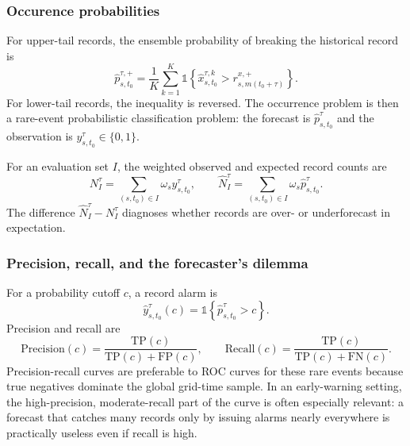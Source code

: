 \documentclass[11pt]{article}
\begin{document}
\subsubsection{Occurence probabilities}

For upper-tail records, the ensemble probability of breaking the historical record is
\begin{equation}
    \hat{p}^{\tau,+}_{s,t_0} = \frac{1}{K}\sum_{k=1}^{K}
    \mathbb{1}\left\{\hat{x}^{\tau,k}_{s,t_0} > r^{x,+}_{s,m(t_0+\tau)}\right\}.
    \label{eq:probupper}
\end{equation}
For lower-tail records, the inequality is reversed. The occurrence problem is then a rare-event probabilistic classification problem: the forecast is $\hat{p}^{\tau}_{s,t_0}$ and the observation is $y^{\tau}_{s,t_0}\in\{0,1\}$.

For an evaluation set $I$, the weighted observed and expected record counts are
\begin{equation}
    N^{\tau}_I = \sum_{(s,t_0)\in I}\omega_s y^{\tau}_{s,t_0}, \qquad
    \hat{N}^{\tau}_I = \sum_{(s,t_0)\in I}\omega_s \hat{p}^{\tau}_{s,t_0}.
    \label{eq:counts}
\end{equation}
The difference $\hat{N}^{\tau}_I - N^{\tau}_I$ diagnoses whether records are over- or underforecast in expectation. 

\subsubsection{Precision, recall, and the forecaster's dilemma}

For a probability cutoff $c$, a record alarm is
\begin{equation}
    \hat{y}^{\tau}_{s,t_0}(c) = \mathbb{1}\left\{\hat{p}^{\tau}_{s,t_0} > c\right\}.
    \label{eq:alarm}
\end{equation}
Precision and recall are
\begin{equation}
    \mathrm{Precision}(c)=\frac{\mathrm{TP}(c)}{\mathrm{TP}(c)+\mathrm{FP}(c)}, \qquad
    \mathrm{Recall}(c)=\frac{\mathrm{TP}(c)}{\mathrm{TP}(c)+\mathrm{FN}(c)}.
    \label{eq:pr}
\end{equation}
Precision-recall curves are preferable to ROC curves for these rare events because true negatives dominate the global grid-time sample. In an early-warning setting, the high-precision, moderate-recall part of the curve is often especially relevant: a forecast that catches many records only by issuing alarms nearly everywhere is practically useless even if recall is high.
\end{document}
